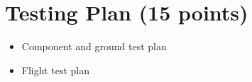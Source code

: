 \documentclass[proposal]{byu-aero}
\begin{document}
\section{Testing Plan (15 points)}
\label{sec:TestingPlan}
\begin{itemize}
    \item Component and ground test plan
    \item Flight test plan 
\end{itemize}


%
\end{document}
